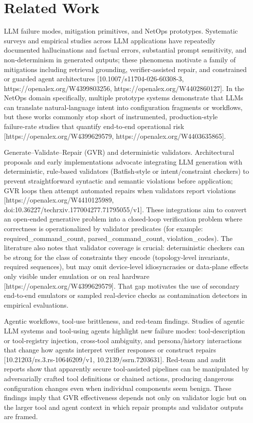 \documentclass[conference]{IEEEtran}
\begin{document}
\section{Related Work}
LLM failure modes, mitigation primitives, and NetOps prototypes. Systematic surveys and empirical studies across LLM applications have repeatedly documented hallucinations and factual errors, substantial prompt sensitivity, and non‑determinism in generated outputs; these phenomena motivate a family of mitigations including retrieval grounding, verifier‑assisted repair, and constrained or guarded agent architectures [10.1007/s11704-026-60308-3, https://openalex.org/W4399803256, https://openalex.org/W4402860127]. In the NetOps domain specifically, multiple prototype systems demonstrate that LLMs can translate natural‑language intent into configuration fragments or workflows, but these works commonly stop short of instrumented, production‑style failure‑rate studies that quantify end‑to‑end operational risk [https://openalex.org/W4399629579, https://openalex.org/W4403635865].

Generate--Validate--Repair (GVR) and deterministic validators. Architectural proposals and early implementations advocate integrating LLM generation with deterministic, rule‑based validators (Batfish‑style or intent/constraint checkers) to prevent straightforward syntactic and semantic violations before application; GVR loops then attempt automated repairs when validators report violations [https://openalex.org/W4410125989, doi:10.36227/techrxiv.177004277.71795055/v1]. These integrations aim to convert an open‑ended generative problem into a closed‑loop verification problem where correctness is operationalized by validator predicates (for example: required\_command\_count, parsed\_command\_count, violation\_codes). The literature also notes that validator coverage is crucial: deterministic checkers can be strong for the class of constraints they encode (topology‑level invariants, required sequences), but may omit device‑level idiosyncrasies or data‑plane effects only visible under emulation or on real hardware [https://openalex.org/W4399629579]. That gap motivates the use of secondary end‑to‑end emulators or sampled real‑device checks as contamination detectors in empirical evaluations.

Agentic workflows, tool‑use brittleness, and red‑team findings. Studies of agentic LLM systems and tool‑using agents highlight new failure modes: tool‑description or tool‑registry injection, cross‑tool ambiguity, and persona/history interactions that change how agents interpret verifier responses or construct repairs [10.21203/rs.3.rs-10646209/v1, 10.2139/ssrn.7203631]. Red‑team and audit reports show that apparently secure tool‑assisted pipelines can be manipulated by adversarially crafted tool definitions or chained actions, producing dangerous configuration changes even when individual components seem benign. These findings imply that GVR effectiveness depends not only on validator logic but on the larger tool and agent context in which repair prompts and validator outputs are framed.
\end{document}
